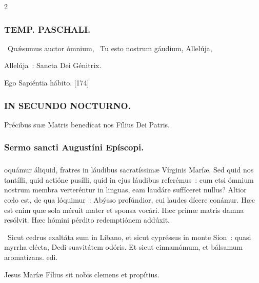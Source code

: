 \documentclass[9pt,twoside]{extarticle}
\begin{document}
\begin{multicols}{2}
{{\subsubsection*{\center \textsc{TEMP. PASCHALI.}}
\begin{tightlist}{}
\item {}~Quǽsumus auctor ómnium, ~Tu esto nostrum gáudium,  Allelúja,  
\item {} Allelúja~: Sancta Dei Génitrix.
\item {} Ego Sapiéntia hábito. [174]
\end{tightlist}

\subsubsection*{\center \textsc{IN SECUNDO NOCTURNO.}}
\begin{tightlist}{}
\item {\small {} Précibus suæ Matris benedícat nos Fílius Dei Patris.}
\end{tightlist}
\subsubsection*{\center Sermo sancti Augustíni Epíscopi.}
\subsubsection*{\center {}}
oquámur áliquid, fratres in láudibus sacratíssimæ Vírginis Maríæ. Sed quid nos tantílli, quid actióne pusílli, quid in ejus láudibus referémus~: cum etsi ómnium nostrum membra verteréntur in linguas, eam laudáre suffíceret nullus? Altior cœlo est, de qua lóquimur~: Abýsso profúndior, cui laudes dícere conámur. Hæc est enim quæ sola méruit mater et sponsa vocári. Hæc primæ matris damna resólvit. Hæc hómini pérdito redemptiónem addúxit.

\begin{tightlist}{}
\item {}~Sicut cedrus exaltáta sum in Líbano, et sicut cypréssus in monte Sion~: quasi myrrha elécta, \textred{*} Dedi suavitátem odóris.
 Et sicut cinnamómum, et bálsamum aromatízans. edi.
\item {\small {} Jesus Maríæ Fílius sit nobis clemens et propítius.}
\end{tightlist}

}}
\end{multicols}
\end{document}
